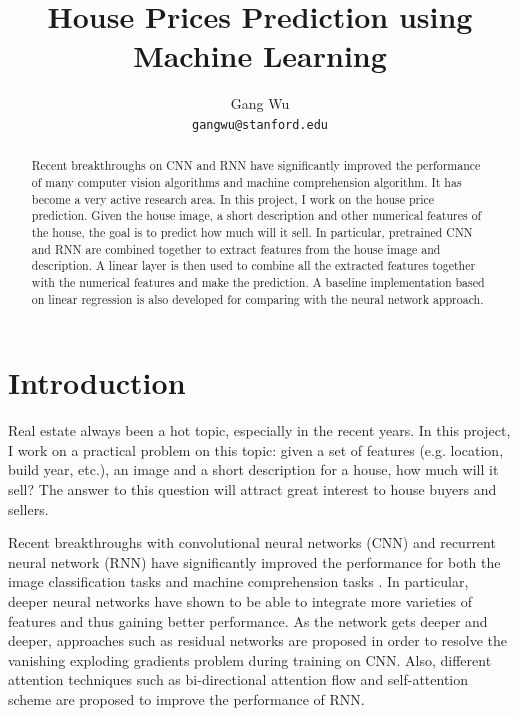 \documentclass{article} %
\title{House Prices Prediction using Machine Learning}
\author{
Gang Wu\\
\texttt{gangwu@stanford.edu} \\
}
\begin{document}
\maketitle

\begin{abstract}   
	Recent breakthroughs on CNN and RNN have significantly improved
	the performance of many computer vision algorithms and machine comprehension 
	algorithm. It has become a very active research area. 
	In this project, I work on the house price prediction.
	Given the house image,
	a short description and other numerical features of the house,
	the goal is to predict how much will it sell.
	In particular, pretrained CNN and RNN are combined together to extract features from the 
	house image and description. 
	A linear layer is then used to combine all the extracted features together
	with the numerical features and make the prediction.
	A baseline implementation based on linear regression is also developed for 
	comparing with the neural network approach.
	
\end{abstract}

\section{Introduction}

Real estate always been a hot topic, especially in the recent years.
In this project, I work on a practical problem on this topic:
given a set of features (e.g. location, build year, etc.), an image
and a short description for a house,
how much will it sell?
The answer to this question will attract great interest to house buyers and sellers.

Recent breakthroughs with convolutional neural networks (CNN)
and recurrent neural network (RNN) have significantly improved the performance for both the image classification tasks \cite{simonyan2014very} and machine comprehension tasks \cite{cho2014learning}. 
In particular, deeper neural
networks have shown to be able to integrate more varieties 
of features and thus gaining better performance. 
As the network gets deeper and deeper, approaches such as residual networks are proposed in order to resolve the vanishing exploding gradients problem \cite{szegedy2016rethinking}
\cite{he2016deep} during training on CNN.
Also, different attention techniques such as bi-directional attention flow \cite{seo2016bidirectional}
and self-attention scheme \cite{wang2017gated} are proposed to improve the performance of RNN.
\end{document}
